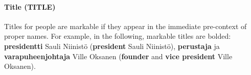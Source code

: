 \documentclass[11pt]{article}
\begin{document}
\paragraph{Title (TITLE)}

Titles for people are markable if they appear in the immediate pre-context of proper names. For example, in the following, markable titles are bolded: \textbf{presidentti} Sauli Niinist\"o (\textbf{president} Sauli Niinist\"o), \textbf{perustaja} ja \textbf{varapuheenjohtaja} Ville Oksanen (\textbf{founder} and \textbf{vice president} Ville Oksanen).   











 
\end{document}
